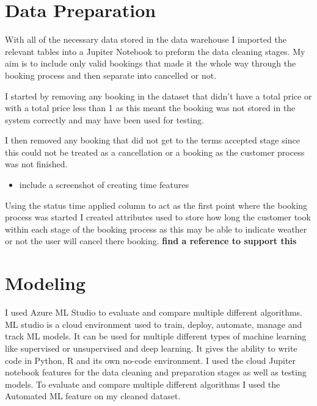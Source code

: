 \section{Data Preparation}


With all of the necessary data stored in the data warehouse I imported the relevant tables into a Jupiter Notebook to preform the data cleaning stages. My aim is to include only valid bookings that made it the whole way through the booking process and then separate into cancelled or not.

I started by removing any booking in the dataset that didn't have a total price or with a total price less than 1 as this meant the booking was not stored in the system correctly and may have been used for testing. 

I then removed any booking that did not get to the terms accepted stage since this could not be treated as a cancellation or a booking as the customer process was not finished.

\begin{itemize}
\item include a screenshot of creating time features
\end{itemize}


Using the status time applied column to act as the first point where the booking process was started I created attributes used to store how long the customer took within each stage of the booking process as this may be able to indicate weather or not the user will cancel there booking.  \textbf{find a reference to support this}

\section{Modeling}

I used Azure ML Studio to evaluate and compare multiple different algorithms. ML studio is a cloud environment used to train, deploy, automate, manage and track ML models. It can be used for multiple different types of machine learning like supervised or unsupervised and deep learning. It gives the ability to write code in Python, R and its own no-code environment.  I used the cloud Jupiter notebook features for the data cleaning and preparation stages as well as testing models. To evaluate and compare multiple different algorithms I used the Automated ML feature on my cleaned dataset.

